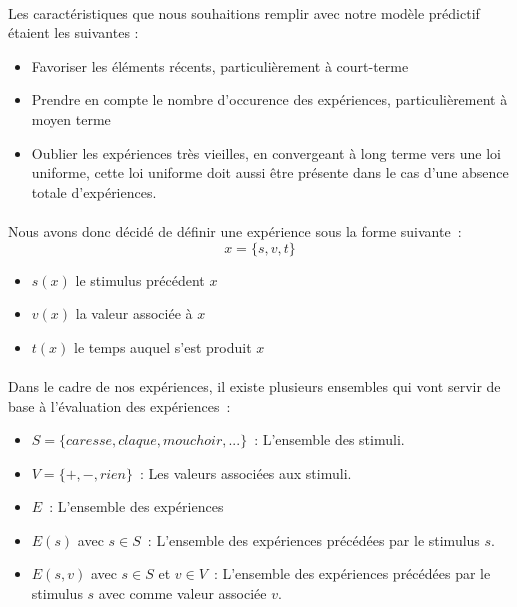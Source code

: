 \paragraph{}
Les caractéristiques que nous souhaitions remplir avec notre modèle prédictif
étaient les suivantes :
\begin{itemize}
\item Favoriser les éléments récents, particulièrement à court-terme
\item Prendre en compte le nombre d'occurence des expériences,
      particulièrement à moyen terme
\item Oublier les expériences très vieilles, en convergeant à long terme vers
      une loi uniforme, cette loi uniforme doit aussi être présente dans le
      cas d'une absence totale d'expériences.
\end{itemize}

\paragraph{}
Nous avons donc décidé de définir une expérience sous
la forme suivante~:
$$x = \{s, v, t\}$$
\begin{itemize}
\item $s(x)$ le stimulus précédent $x$
\item $v(x)$ la valeur associée à $x$
\item $t(x)$ le temps auquel s'est produit $x$
\end{itemize}

\paragraph{}
Dans le cadre de nos expériences, il existe plusieurs ensembles qui vont
servir de base à l'évaluation des expériences~:
\begin{itemize}
\item $S=\{caresse, claque, mouchoir, ...\}$~: L'ensemble des stimuli.
\item $V=\{+,-,rien\}$~: Les valeurs associées aux stimuli.
\item $E$~: L'ensemble des expériences
\item $E(s)$ avec $s \in S$~: L'ensemble des expériences précédées par le
      stimulus $s$.
\item $E(s,v)$ avec $s \in S$ et $v \in V$~: L'ensemble des expériences
      précédées par le stimulus $s$ avec comme valeur associée $v$.
\end{itemize}

